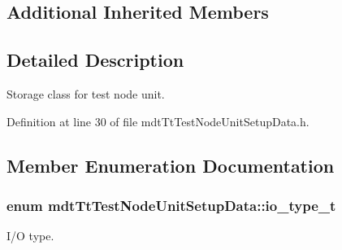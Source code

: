 \subsection*{Additional Inherited Members}


\subsection{Detailed Description}
Storage class for test node unit. 

Definition at line 30 of file mdt\-Tt\-Test\-Node\-Unit\-Setup\-Data.\-h.



\subsection{Member Enumeration Documentation}
\hypertarget{classmdt_tt_test_node_unit_setup_data_a4e69dcc72bebc34d6db64cff91dbfc54}{
\subsubsection[{io\-\_\-type\-\_\-t}]{\setlength{\rightskip}{0pt plus 5cm}enum {\bf mdt\-Tt\-Test\-Node\-Unit\-Setup\-Data\-::io\-\_\-type\-\_\-t}}}\label{classmdt_tt_test_node_unit_setup_data_a4e69dcc72bebc34d6db64cff91dbfc54}


I/\-O type. 


